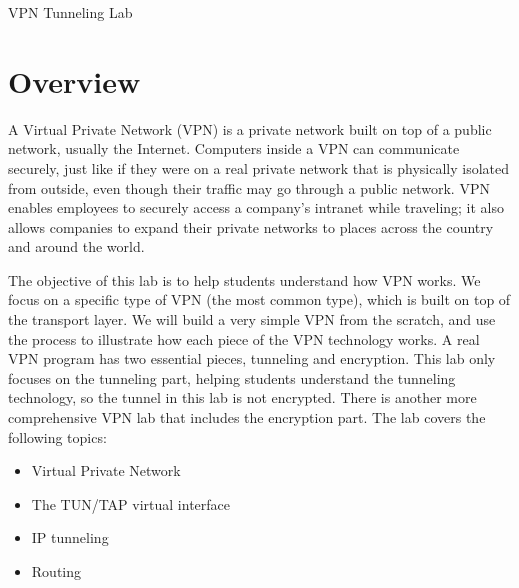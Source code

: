 



\newcommand{\miniVPN}{{\tt MiniVPN}\xspace}
\newcommand{\vpnFigs}{./Figs}



\newcommand{\hostu}{{\tt U}\xspace}
\newcommand{\hostv}{{\tt V}\xspace}




\begin{center}
{\LARGE VPN Tunneling Lab}
\end{center}


\setcounter{task}{1}
\newcommand{\tasks} {\bf {\noindent (\arabic{task})} \addtocounter{task}{1} \,}

\section{Overview}

A Virtual Private Network (VPN) is a private network built on top of a
public network, usually the Internet. Computers inside a VPN can
communicate securely, just like if they were on a real private network that
is physically isolated from outside, even though their traffic may go
through a public network. VPN enables employees to securely access a
company's intranet while traveling; it also allows companies to expand
their private networks to places across the country and around the world.


The objective of this lab is to help students understand how 
VPN works. We focus on a specific type
of VPN (the most common type), which is built on top of the transport layer.
We will build a very simple VPN from the scratch, and use the process to 
illustrate how each piece of the VPN technology works. A real VPN 
program has two essential pieces, tunneling and encryption. This lab only 
focuses on the tunneling part, helping students understand the tunneling 
technology, so the tunnel in this lab is not encrypted. 
There is another more comprehensive VPN lab that includes the encryption part.
The lab covers the following topics:  

\begin{itemize}[noitemsep]
\item Virtual Private Network
\item The TUN/TAP virtual interface 
\item IP tunneling 
\item Routing
\end{itemize}


